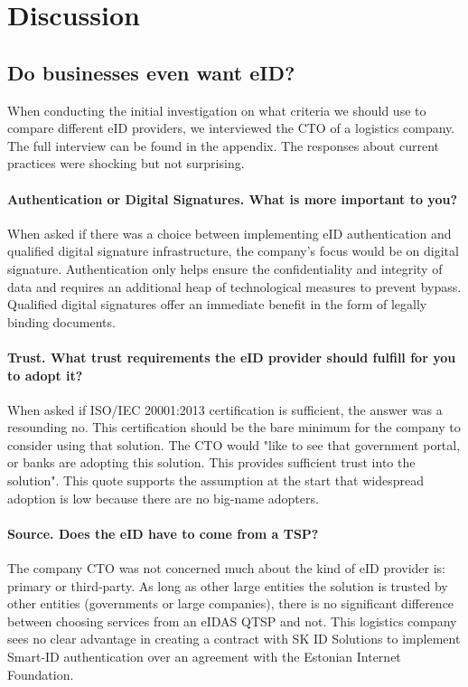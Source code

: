 \section{Discussion}

\subsection{Do businesses even want eID?}

When conducting the initial investigation on what criteria we should use to compare different eID providers, we interviewed the CTO of a logistics company. The full interview can be found in the appendix. The responses about current practices were shocking but not surprising.

\paragraph{Authentication or Digital Signatures. What is more important to you?}

When asked if there was a choice between implementing eID authentication and qualified digital signature infrastructure, the company's focus would be on digital signature. Authentication only helps ensure the confidentiality and integrity of data and requires an additional heap of technological measures to prevent bypass. Qualified digital signatures offer an immediate benefit in the form of legally binding documents.

\paragraph{Trust. What trust requirements the eID provider should fulfill for you to adopt it?}

When asked if ISO/IEC 20001:2013 certification is sufficient, the answer was a resounding no. This certification should be the bare minimum for the company to consider using that solution. The CTO would "like to see that government portal, or banks are adopting this solution. This provides sufficient trust into the solution". This quote supports the assumption at the start that widespread adoption is low because there are no big-name adopters.

\paragraph{Source. Does the eID have to come from a TSP?}

The company CTO was not concerned much about the kind of eID provider is: primary or third-party. As long as other large entities the solution is trusted by other entities (governments or large companies), there is no significant difference between choosing services from an eIDAS QTSP and not. This logistics company sees no clear advantage in creating a contract with SK ID Solutions to implement Smart-ID authentication over an agreement with the Estonian Internet Foundation.

